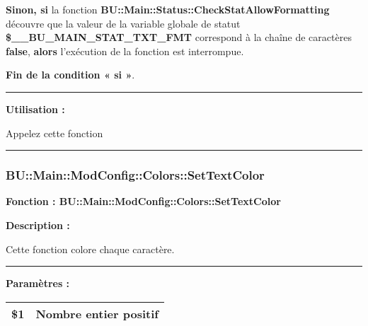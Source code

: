 \documentclass[a4paper,10pt]{article}
\begin{document}
\begin{justify}
    \textbf{\color{cond}Sinon, si} la fonction \textbf{\color{func}BU::Main::Status::CheckStatAllowFormatting} découvre que la valeur de la variable globale de statut \textbf{\color{vars}\$\_\_BU\_MAIN\_STAT\_TXT\_FMT} correspond à la chaîne de caractères \textbf{false}, \textbf{\color{cond}alors} l'exécution de la fonction est interrompue.
\end{justify}

\begin{justify}
    \textbf{\color{cond}Fin de la condition « si »}.
\end{justify}


\par\noindent\rule{\textwidth}{0.4pt}

\begin{justify}
    \textbf{Utilisation :}

    Appelez cette fonction
\end{justify}






\color{sec3}\par\noindent\rule{\textwidth}{0.4pt}\color{text}

\color{sec3}
\subsubsection{BU::Main::ModConfig::Colors::SetTextColor}\color{text}

\begin{justify}
    \textbf{Fonction : \color{func}BU::Main::ModConfig::Colors::SetTextColor}
\end{justify}

\begin{justify}
    \textbf{Description :}

    Cette fonction colore chaque caractère.
\end{justify}


\par\noindent\rule{\textwidth}{0.4pt}

\begin{justify}
    \textbf{Paramètres :}

    \begin{tabular}{|l|l|}
        \hline
        \textbf{\color{orange}\$1} & Nombre entier positif\\
        \hline
    \end{tabular}
\end{justify}
\end{document}
